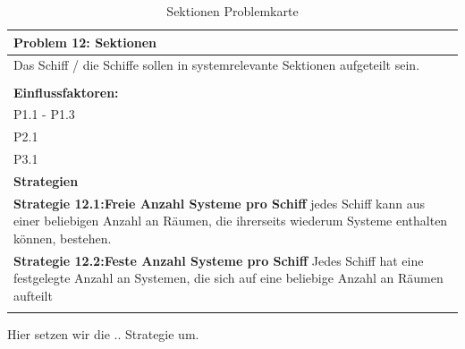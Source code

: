\documentclass[fontsize=12pt,paper=a4,twoside]{scrartcl}
\begin{document}
\begin{table}[H]
    \centering
    \begin{tabular}{|p{15cm}|}
    \hline
          \textbf{Problem 12: Sektionen}  \\ \hline
	Das Schiff / die Schiffe sollen in systemrelevante Sektionen aufgeteilt sein. \\
         \\ \hline
          \textbf{Einflussfaktoren: } \\
	P1.1 - P1.3 \\
	P2.1 \\
	P3.1 \\
          \hline
          \textbf{Strategien} \\ \hline
            {}          
           \label{strategie:12.1}     
          \textbf{Strategie 12.1:Freie Anzahl Systeme pro Schiff} jedes Schiff kann aus einer beliebigen Anzahl an Räumen, die ihrerseits wiederum Systeme enthalten können, bestehen.  \\        
  {}          
           \label{strategie:12.2}              
          \textbf{Strategie 12.2:Feste Anzahl Systeme pro Schiff} Jedes Schiff hat eine festgelegte Anzahl an Systemen, die sich auf eine beliebige Anzahl an Räumen aufteilt  \\ 
	 \\ \hline
    \end{tabular}

    \caption{Sektionen Problemkarte}
    \label{tab:ProblemKarte12}
\end{table}
Hier setzen wir die .. Strategie um. \\
\end{document}
